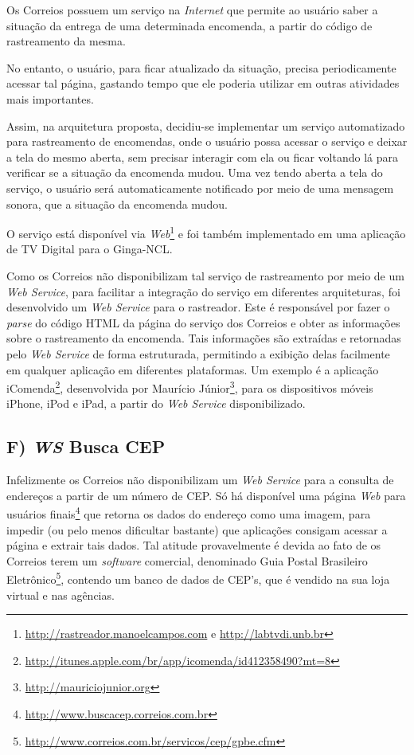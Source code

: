 Os Correios possuem um serviço na \textit{Internet} que permite ao usuário
saber a situação da entrega de uma determinada encomenda,
a partir do código de rastreamento da mesma.

No entanto, o usuário, para ficar atualizado da situação,
precisa periodicamente acessar tal página, gastando
tempo que ele poderia utilizar em outras atividades
mais importantes.

Assim, na arquitetura proposta, decidiu-se implementar um
serviço automatizado para rastreamento de encomendas,
onde o usuário possa acessar o serviço e deixar a tela
do mesmo aberta, sem precisar interagir com ela ou ficar voltando
lá para verificar se a situação da encomenda mudou.
Uma vez tendo aberta a tela do serviço, o usuário será
automaticamente notificado por meio de uma mensagem sonora,
que a situação da encomenda mudou.

O serviço está disponível via \textit{Web}\footnote{\url{http://rastreador.manoelcampos.com} e \url{http://labtvdi.unb.br}}
e foi também implementado em uma aplicação de TV Digital para o Ginga-NCL.

Como os Correios não disponibilizam
tal serviço de rastreamento por meio de um \textit{Web Service}, 
para facilitar a integração do serviço em diferentes arquiteturas, foi desenvolvido
um \textit{Web Service} para o rastreador. 
Este é responsável por fazer o \textit{parse} do código HTML da página do serviço dos Correios
e obter as informações sobre o rastreamento da encomenda. Tais informações
são extraídas e retornadas pelo \textit{Web Service} de forma estruturada, permitindo
a exibição delas facilmente em qualquer aplicação em diferentes plataformas.
Um exemplo é a aplicação iComenda\footnote{\url{http://itunes.apple.com/br/app/icomenda/id412358490?mt=8}}, 
desenvolvida por Maurício Júnior\footnote{\url{http://mauriciojunior.org}}, para os dispositivos
móveis iPhone, iPod e iPad, a partir do \textit{Web Service} disponibilizado.

\subsection*{F) \textit{WS} Busca CEP}

Infelizmente os Correios não disponibilizam um \textit{Web Service}
para a consulta de endereços a partir de um número de CEP.
Só há disponível uma página \textit{Web} para usuários finais\footnote{\url{http://www.buscacep.correios.com.br}}
que retorna os dados do endereço como uma imagem, para impedir (ou pelo menos dificultar bastante) 
que aplicações consigam acessar a página e extrair tais dados. Tal atitude provavelmente
é devida ao fato de os Correios terem um \textit{software} comercial, denominado
Guia Postal Brasileiro Eletrônico\footnote{\url{http://www.correios.com.br/servicos/cep/gpbe.cfm}}, 
contendo um banco de dados de CEP's, que é vendido na sua loja virtual e nas agências.

